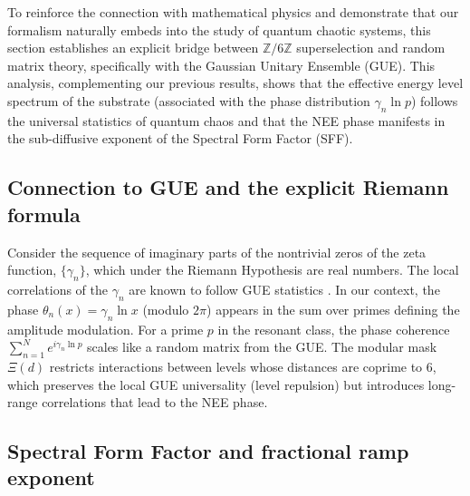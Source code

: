 \documentclass[12pt,a4paper]{article}
\theoremstyle{plain}
\theoremstyle{definition}
\theoremstyle{remark}
\begin{document}
To reinforce the connection with mathematical physics and demonstrate that our formalism naturally embeds into the study of quantum chaotic systems, this section establishes an explicit bridge between $\mathbb{Z}/6\mathbb{Z}$ superselection and random matrix theory, specifically with the Gaussian Unitary Ensemble (GUE). This analysis, complementing our previous results, shows that the effective energy level spectrum of the substrate (associated with the phase distribution $\gamma_n \ln p$) follows the universal statistics of quantum chaos and that the NEE phase manifests in the sub-diffusive exponent of the Spectral Form Factor (SFF).

\subsection{Connection to GUE and the explicit Riemann formula}

Consider the sequence of imaginary parts of the nontrivial zeros of the zeta function, $\{\gamma_n\}$, which under the Riemann Hypothesis are real numbers. The local correlations of the $\gamma_n$ are known to follow GUE statistics \cite{Montgomery1973}. In our context, the phase $\theta_n(x) = \gamma_n \ln x$ (modulo $2\pi$) appears in the sum over primes defining the amplitude modulation. For a prime $p$ in the resonant class, the phase coherence $\sum_{n=1}^N e^{i\gamma_n \ln p}$ scales like a random matrix from the GUE. The modular mask $\Xi(d)$ restricts interactions between levels whose distances are coprime to 6, which preserves the local GUE universality (level repulsion) but introduces long-range correlations that lead to the NEE phase.

\subsection{Spectral Form Factor and fractional ramp exponent}
\end{document}
